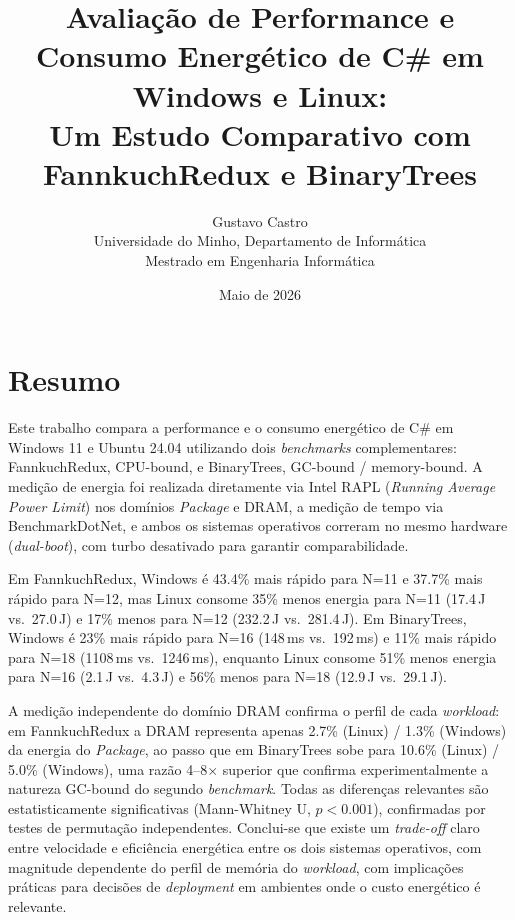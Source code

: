 \documentclass[12pt,a4paper]{article}
\title{Avaliação de Performance e Consumo Energético de C\# em Windows e Linux:\\
Um Estudo Comparativo com FannkuchRedux e BinaryTrees}
\author{Gustavo Castro\\
\small Universidade do Minho, Departamento de Informática\\
\small Mestrado em Engenharia Informática}
\date{Maio de 2026}
\begin{document}
\maketitle
\tableofcontents
\newpage

\section{Resumo}

Este trabalho compara a performance e o consumo energético de C\# em Windows 11 e
Ubuntu 24.04 utilizando dois \textit{benchmarks} complementares: FannkuchRedux,
CPU-bound, e BinaryTrees, GC-bound / memory-bound.
A medição de energia foi realizada diretamente via Intel RAPL
(\textit{Running Average Power Limit}) nos domínios \textit{Package} e DRAM,
a medição de tempo via BenchmarkDotNet, e ambos os sistemas operativos correram
no mesmo hardware (\textit{dual-boot}), com turbo desativado para garantir
comparabilidade.

Em FannkuchRedux, Windows é 43.4\% mais rápido para N=11 e 37.7\% mais rápido
para N=12, mas Linux consome 35\% menos energia para N=11 (17.4\,J vs.\
27.0\,J) e 17\% menos para N=12 (232.2\,J vs.\ 281.4\,J).
Em BinaryTrees, Windows é 23\% mais rápido para N=16 (148\,ms vs.\ 192\,ms) e
11\% mais rápido para N=18 (1108\,ms vs.\ 1246\,ms), enquanto Linux consome
51\% menos energia para N=16 (2.1\,J vs.\ 4.3\,J) e 56\% menos para N=18
(12.9\,J vs.\ 29.1\,J).

A medição independente do domínio DRAM confirma o perfil de cada
\textit{workload}: em FannkuchRedux a DRAM representa apenas 2.7\% (Linux) /
1.3\% (Windows) da energia do \textit{Package}, ao passo que em BinaryTrees
sobe para 10.6\% (Linux) / 5.0\% (Windows), uma razão 4--8$\times$ superior
que confirma experimentalmente a natureza GC-bound do segundo
\textit{benchmark}.
Todas as diferenças relevantes são estatisticamente significativas
(Mann-Whitney U, $p < 0.001$), confirmadas por testes de permutação
independentes.
Conclui-se que existe um \textit{trade-off} claro entre velocidade e
eficiência energética entre os dois sistemas operativos, com magnitude
dependente do perfil de memória do \textit{workload}, com implicações
práticas para decisões de \textit{deployment} em ambientes onde o custo
energético é relevante.

\end{document}
